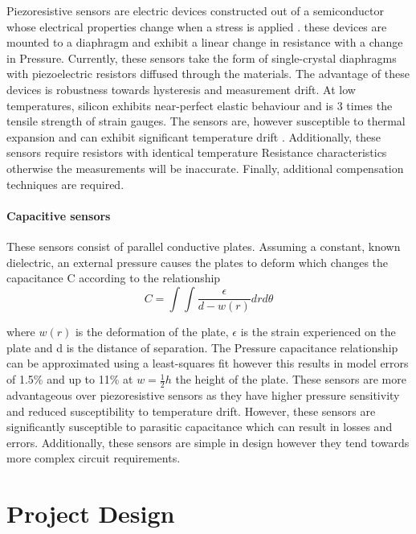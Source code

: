 Piezoresistive sensors are electric devices constructed out of a semiconductor whose electrical properties change when a stress is applied \cite{eaton1997micromachined}. these devices are mounted to a diaphragm and exhibit a linear change in resistance with a change in Pressure. Currently, these sensors take the form of single-crystal diaphragms with piezoelectric resistors diffused through the materials. The advantage of these devices is robustness towards hysteresis and measurement drift. At low temperatures, silicon exhibits near-perfect elastic behaviour and is  3 times the tensile strength of strain gauges\cite{eaton1997micromachined}. The sensors are, however susceptible to thermal expansion and can exhibit significant temperature drift \cite{samaun1971ic}. Additionally, these sensors require resistors with identical temperature Resistance characteristics otherwise the measurements will be inaccurate. Finally, additional compensation techniques are required.

\subsubsection{Capacitive sensors}

These sensors consist of parallel conductive plates. Assuming a constant, known dielectric, an external pressure causes the plates to deform which changes the capacitance C according to the relationship \cite{eaton1997micromachined}
\begin{equation}
	C = \int \int \frac{\epsilon}{d - w(r)}drd\theta
\end{equation}

where $w(r)$ is the deformation of the plate, $\epsilon$ is the strain experienced on the plate and d is the distance of separation. The Pressure capacitance relationship can be approximated using a least-squares fit \cite{eaton1997micromachined} however this results in model errors of 1.5\% and up to 11\% at $w = \frac{1}{2}h$ the height of the plate. These sensors are more advantageous over piezoresistive sensors as they have higher pressure sensitivity and reduced susceptibility to temperature drift. However, these sensors are significantly susceptible to parasitic capacitance which can result in losses and errors. Additionally, these sensors are simple in design however they tend towards more complex circuit requirements.

\newpage
\chapter{Project Design}

